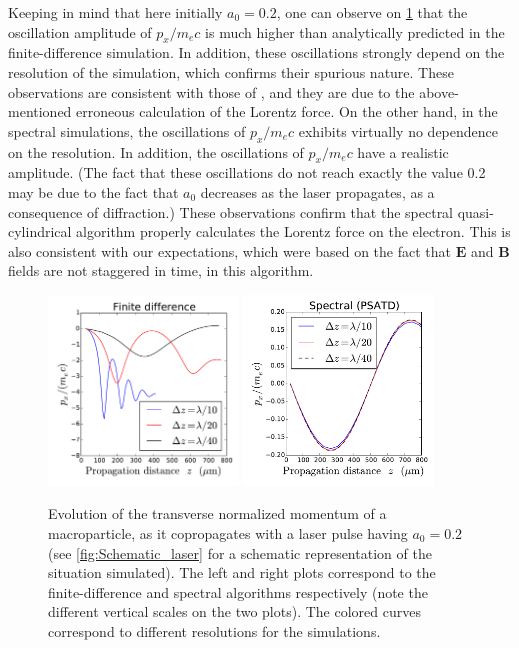 \documentclass[1p,times]{elsarticle}
\renewcommand{\vec}[1]{\boldsymbol{#1}}
\begin{document}
Keeping in mind that here initially $a_0=0.2$, one can observe on
\cref{fig:Laser} that the oscillation amplitude of $p_x/m_e c$
is much higher than analytically predicted in the finite-difference
simulation. In addition, these oscillations strongly depend on the
resolution of the simulation, which confirms their spurious nature. These
observations are consistent with those of \cite{LehePRSTAB2014}, and
they are due to the above-mentioned erroneous calculation of the
Lorentz force. On the other hand, in the spectral simulations, the
oscillations of $p_x/m_e c$ exhibits virtually no dependence on the
resolution. In addition, the oscillations of $p_x/m_e c$ have a realistic
amplitude. (The fact that these oscillations do not reach exactly the
value 0.2 may be due to the fact that $a_0$ decreases as the laser
propagates, as a consequence of diffraction.) These observations
confirm that the spectral quasi-cylindrical algorithm properly calculates
the Lorentz force on the electron. This is also consistent with our
expectations, which were based on the fact that $\vec{E}$ and
$\vec{B}$ fields are not staggered in time, in this algorithm.

\begin{figure}[!h]
\centering
\includegraphics[width=0.45\textwidth]{Laser_finite-difference.pdf}
\includegraphics[width=0.45\textwidth]{Laser_spectral.pdf}
\caption{\label{fig:Laser}Evolution of the transverse normalized
  momentum of a macroparticle, as it copropagates with a
  laser pulse having $a_0 = 0.2$ (see \cref{fig:Schematic_laser} for a
  schematic representation of the situation simulated). The left and
  right plots correspond to the finite-difference and spectral
  algorithms respectively (note the different vertical scales on the two
  plots). The colored curves correspond to different resolutions for the simulations.}
\end{figure}
\end{document}
